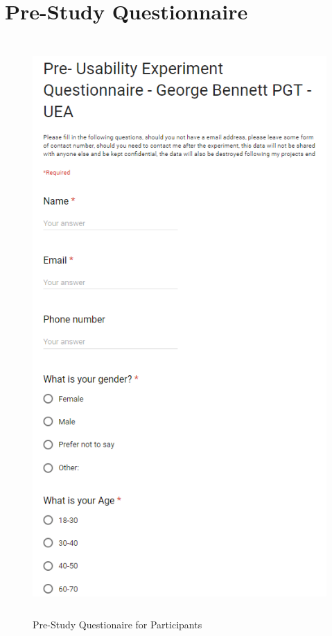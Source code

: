 \section{Pre-Study Questionnaire}
\begin{figure}[H]
    \includegraphics[width=16cm,height=22cm]{Screenshots/StudyMaterialScreenshots/preStudyQuestionairePT1.png}
    \caption{Pre-Study Questionaire for Participants}
\end{figure}

